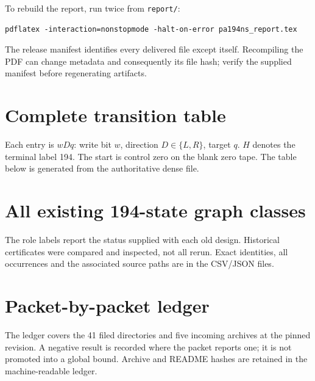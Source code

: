 \documentclass[11pt,letterpaper]{article}
\newcommand{\file}[1]{\texttt{\nolinkurl{#1}}}
\begin{document}
To rebuild the report, run twice from \file{report/}:
\begin{verbatim}
pdflatex -interaction=nonstopmode -halt-on-error pa194ns_report.tex
\end{verbatim}
The release manifest identifies every delivered file except itself.
Recompiling the PDF can change metadata and consequently its file hash;
verify the supplied manifest before regenerating artifacts.

\appendix
\clearpage
\section{Complete transition table}\label{app:table}
Each entry is $wDq$: write bit $w$, direction $D\in\{L,R\}$, target $q$.
$H$ denotes the terminal label 194. The start is control zero on the blank
zero tape. The table below is generated from the authoritative dense file.


\clearpage
\section{All existing 194-state graph classes}\label{app:frontier}
The role labels report the status supplied with each old design. Historical
certificates were compared and inspected, not all rerun. Exact identities,
all occurrences and the associated source paths are in the CSV/JSON files.


\clearpage
\section{Packet-by-packet ledger}\label{app:ledger}
The ledger covers the 41 filed directories and five incoming archives at
the pinned revision. A negative result is recorded where the packet reports
one; it is not promoted into a global bound. Archive and README hashes are
retained in the machine-readable ledger.

\end{document}
